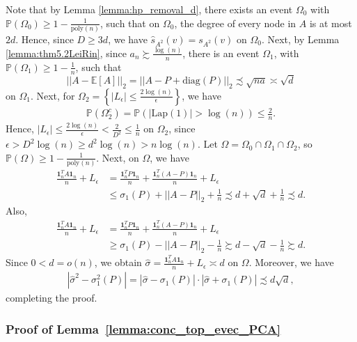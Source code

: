\documentclass{article}
\newcommand{\sigmahat}{\ensuremath{\widehat{\sigma}}}
\begin{document}
Note that by Lemma \ref{lemma:hp_removal_d}, there exists an event $\Omega_0$ with $\mathbb{P}(\Omega_0) \geq 1 - \frac{1}{\mathrm{poly}(n)}$, such that on $\Omega_0$, the degree of every node in $A$ is at most $2d$. Hence, since $D \geq 3d$, we have $\widehat{s}_{A^2}(v) = s_{A^2}(v)$ on $\Omega_0$. Next, by Lemma \ref{lemma:thm5.2LeiRin}, since $a_n \succsim \frac{\log(n)}{n}$, there is an event $\Omega_1$, with $\mathbb{P}(\Omega_1) \geq 1 - \frac{1}{n}$, such that
\begin{equation*}
||A - \mathbb{E}[A]||_2 = ||A - P + \text{diag}(P)||_2 \precsim \sqrt{na} \asymp \sqrt{d}
\end{equation*}
on $\Omega_1$. Next, for $\Omega_2 = \left\{|L_\epsilon| \leq \frac{2\log(n)}{\epsilon}\right\}$, we have
\begin{align*}
\mathbb{P}\left(\Omega_2^c\right) = \mathbb{P}\left(|\mathrm{Lap}(1)| > \log(n)\right) \leq \frac{2}{n}.
\end{align*}
Hence, $|L_\epsilon| \leq \frac{2\log(n)}{\epsilon} < \frac{2}{D^2} \leq \frac{1}{n}$ on $\Omega_2$, since $\epsilon > D^2\log(n) \geq d^2\log(n) > n\log(n)$. Let $\Omega = \Omega_0 \cap \Omega_1 \cap \Omega_2$, so $\mathbb{P}(\Omega) \geq 1 - \frac{1}{\mathrm{poly}(n)}$. Next, on $\Omega$, we have
\begin{align*}
\frac{\textbf{1}_n^T A\textbf{1}_n}{n} + L_\epsilon & = \frac{\textbf{1}_n^T P\textbf{1}_n}{n} + \frac{\textbf{1}_n^T(A - P)\textbf{1}_n}{n} + L_\epsilon \\
%
& \leq \sigma_1(P) + ||A - P||_2 + \frac{1}{n} \precsim d + \sqrt{d} + \frac{1}{n} \precsim d. 
\end{align*}
Also,
\begin{align*}
\frac{\textbf{1}_n^T A\textbf{1}_n}{n} + L_\epsilon & = \frac{\textbf{1}_n^T P\textbf{1}_n}{n} + \frac{\textbf{1}_n^T(A - P)\textbf{1}_n}{n} + L_\epsilon \\
%
& \geq \sigma_1(P) - ||A - P||_2 - \frac{1}{n} \succsim d - \sqrt{d} - \frac{1}{n} \succsim d.
\end{align*}
Since $0 < d = o(n)$, we obtain $\sigmahat = \frac{\textbf{1}_n^T A\textbf{1}_n}{n} + L_\epsilon \asymp d$ on $\Omega$. Moreover, we have
\begin{align*}
|\sigmahat^2 - \sigma_1^2(P)| = |\sigmahat - \sigma_1(P)|\cdot|\sigmahat + \sigma_1(P)| \precsim d\sqrt{d},
\end{align*}
completing the proof.


\subsubsection{Proof of Lemma~\ref{lemma:conc_top_evec_PCA}}
\label{AppTopEvec}
\end{document}
